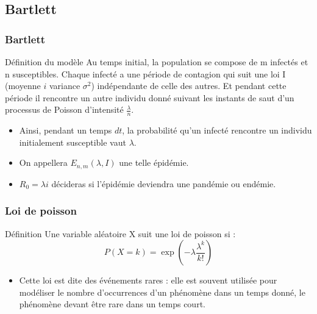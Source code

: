 \subsection{Bartlett}

\begin{frame}
    \frametitle{Bartlett}

    \begin{block}{Définition du modèle}
        Au temps initial, la population se compose de m infectés et n susceptibles. Chaque infecté a une période de contagion qui suit une loi I (moyenne $i$ variance $\sigma^2$) indépendante de celle des autres. Et pendant cette période il rencontre un autre individu donné suivant les instants de saut d’un processus de Poisson d’intensité $\frac{\lambda}{n}$.
    \end{block}

    \begin{itemize}
        \item Ainsi, pendant un temps $dt$, la probabilité qu’un infecté rencontre un individu initialement susceptible vaut $\lambda$.
        \item On appellera $E_{n,m}(\lambda, I)$ une telle épidémie.
        \item $R_0 = \lambda i$ décideras si l'épidémie deviendra une pandémie ou endémie.
    \end{itemize}

\end{frame}

\begin{frame}
    \frametitle{Loi de poisson}

    \begin{block}{Définition}
        Une variable aléatoire X suit une loi de poisson si :
        $$ P(X=k) = \exp(-\lambda \frac{\lambda^k}{k!}) $$
    \end{block}

    \begin{itemize}
        \item Cette loi est dite des événements rares : elle est souvent utilisée pour modéliser le nombre d'occurrences d'un phénomène dans un temps donné, le phénomène devant être rare dans un temps court.
    \end{itemize}

\end{frame}
